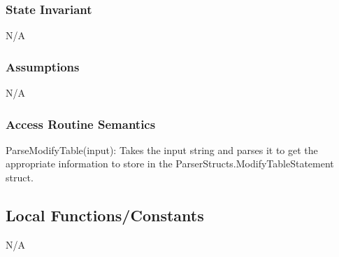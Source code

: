 \documentclass[12pt]{article}
\begin{document}
{\subsubsection{State Invariant}
N/A

\subsubsection{Assumptions}
N/A

\subsubsection{Access Routine Semantics}
\noindent ParseModifyTable(input): Takes the input string and parses it to get the appropriate information to store in the ParserStructs.ModifyTableStatement struct.\\

\subsection{Local Functions/Constants}
N/A}

\newpage
\end{document}
